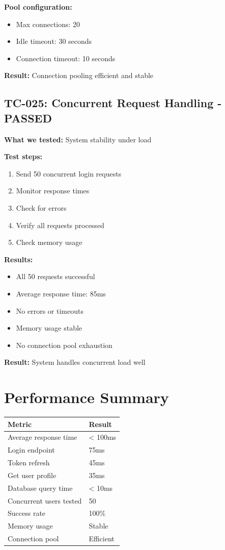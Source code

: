 \documentclass[11pt,a4paper]{article}
\begin{document}
\textbf{Pool configuration:}
\begin{itemize}
    \item Max connections: 20
    \item Idle timeout: 30 seconds
    \item Connection timeout: 10 seconds
\end{itemize}

\textbf{Result:} Connection pooling efficient and stable

\subsection{TC-025: Concurrent Request Handling - PASSED}
\textbf{What we tested:} System stability under load

\textbf{Test steps:}
\begin{enumerate}
    \item Send 50 concurrent login requests
    \item Monitor response times
    \item Check for errors
    \item Verify all requests processed
    \item Check memory usage
\end{enumerate}

\textbf{Results:}
\begin{itemize}
    \item All 50 requests successful
    \item Average response time: 85ms
    \item No errors or timeouts
    \item Memory usage stable
    \item No connection pool exhaustion
\end{itemize}

\textbf{Result:} System handles concurrent load well

\section{Performance Summary}

\begin{tabular}{ll}
\toprule
\textbf{Metric} & \textbf{Result} \\
\midrule
Average response time & < 100ms \\
Login endpoint & 75ms \\
Token refresh & 45ms \\
Get user profile & 35ms \\
Database query time & < 10ms \\
Concurrent users tested & 50 \\
Success rate & 100\% \\
Memory usage & Stable \\
Connection pool & Efficient \\
\bottomrule
\end{tabular}
\end{document}
